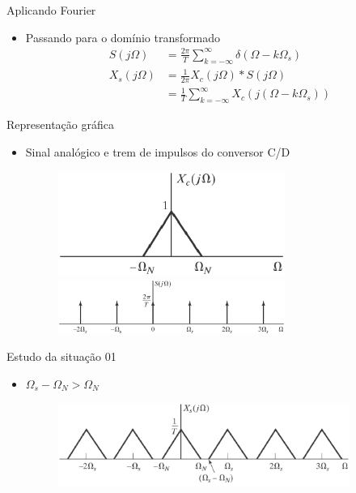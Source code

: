 \begin{slide}{Aplicando Fourier}
\begin{itemize}
   \item Passando para o dom\'inio transformado
   \begin{align}
      S(j\Omega)  &= \frac{2\pi}{T}\sum_{k=-\infty}^{\infty}\delta(\Omega-k\Omega_s)\\
      X_s(j\Omega)&= \frac{1}{2\pi}X_c(j\Omega)*S(j\Omega)\\
                 &= \frac{1}{T}\sum_{k=-\infty}^{\infty}X_c(j(\Omega-k\Omega_s))
   \end{align}
\end{itemize}
\end{slide}

\begin{slide}{Representa\c c\~ao gráfica}
\begin{itemize}
   \item Sinal analógico e trem de impulsos do conversor C/D 
   \begin{figure}
      \centering
      \includegraphics[width=0.7\textwidth]{figs/espectro01a.eps}
      \includegraphics[width=0.7\textwidth]{figs/espectro01b.eps}
   \end{figure}
\end{itemize}
\end{slide}

\begin{slide}{Estudo da situação 01}
\begin{itemize}
   \item $\Omega_s-\Omega_N>\Omega_N$
   \begin{figure}
      \centering
      \includegraphics[width=0.9\textwidth]{figs/situacao01.eps}
   \end{figure}
\end{itemize}
\end{slide}


